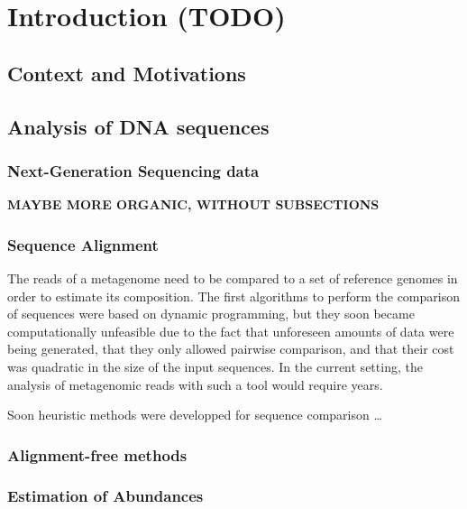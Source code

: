 
\chapter{Introduction (\textbf{TODO})}
\label{Chapter1}

\section{Context and Motivations}

\section{Analysis of DNA sequences}

\subsection{Next-Generation Sequencing data}

\textbf{MAYBE MORE ORGANIC, WITHOUT SUBSECTIONS}

\subsection{Sequence Alignment}
The reads of a metagenome need to be compared to a set of reference genomes in order to estimate its composition. The first algorithms to perform the comparison of sequences were based on dynamic programming, but they soon became computationally unfeasible due to the fact that unforeseen amounts of data were being generated, that they only allowed pairwise comparison, and that their cost was quadratic in the size of the input sequences. In the current setting, the analysis of metagenomic reads with such a tool would require years.

Soon heuristic methods were developped for sequence comparison \dots

\subsection{Alignment-free methods}

\subsection{Estimation of Abundances}
